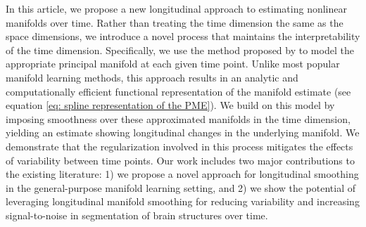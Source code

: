 \documentclass[12pt]{article}
\theoremstyle{definition}
\begin{document}

In this article, we propose a new longitudinal approach to estimating nonlinear manifolds over time. Rather than treating the time dimension the same as the space dimensions, we introduce a novel process that maintains the interpretability of the time dimension. Specifically, we use the method proposed by \cite{mengPrincipalManifoldEstimation2021} to model the appropriate principal manifold at each given time point. Unlike most popular manifold learning methods, this approach results in an analytic and computationally efficient functional representation of the manifold estimate (see equation \eqref{eq: spline representation of the PME}). We build on this model by imposing smoothness over these approximated manifolds in the time dimension, yielding an estimate showing longitudinal changes in the underlying manifold. We demonstrate that the regularization involved in this process mitigates the effects of variability between time points. Our work includes two major contributions to the existing literature: 1) we propose a novel approach for longitudinal smoothing in the general-purpose manifold learning setting, and 2) we show the potential of leveraging longitudinal manifold smoothing for reducing variability and increasing signal-to-noise in segmentation of brain structures over time. 
\end{document}
